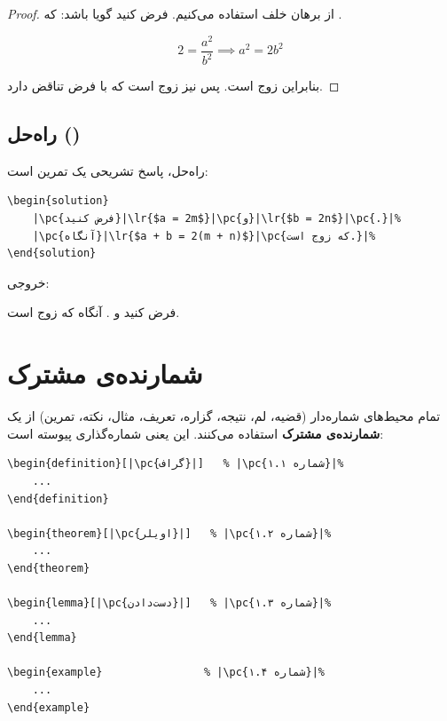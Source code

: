 \begin{proof}
    از برهان خلف استفاده می‌کنیم. فرض کنید 
    گویا باشد:  که
    .

    \[
    2 = \frac{a^{2}}{b^{2}} \implies a^{2} = 2b^{2}
    \]

    بنابراین  زوج است. پس  نیز
    زوج است که با فرض 
    تناقض دارد.
\end{proof}


\subsection{راه‌حل ()}
\label{sec:environments-solution}

راه‌حل، پاسخ تشریحی یک تمرین است:

\begin{latin}
\begin{verbatim}
\begin{solution}
    |\pc{فرض کنید}|\lr{$a = 2m$}|\pc{و}|\lr{$b = 2n$}|\pc{.}|%
    |\pc{آنگاه}|\lr{$a + b = 2(m + n)$}|\pc{که زوج است.}|%
\end{solution}
\end{verbatim}
\end{latin}

خروجی:

\begin{solution}
    فرض کنید  و .
    آنگاه  که زوج است.
\end{solution}


\section{شمارنده‌ی مشترک}
\label{sec:environments-counter}

تمام محیط‌های شماره‌دار (قضیه، لم، نتیجه، گزاره،
تعریف، مثال، نکته، تمرین) از یک \textbf{شمارنده‌ی
مشترک} استفاده می‌کنند. این یعنی شماره‌گذاری
پیوسته است:

\begin{latin}
\begin{verbatim}
\begin{definition}[|\pc{گراف}|]   % |\pc{شماره ۱.۱}|%
    ...
\end{definition}

\begin{theorem}[|\pc{اویلر}|]   % |\pc{شماره ۱.۲}|%
    ...
\end{theorem}

\begin{lemma}[|\pc{دست‌دادن}|]   % |\pc{شماره ۱.۳}|%
    ...
\end{lemma}

\begin{example}                % |\pc{شماره ۱.۴}|%
    ...
\end{example}
\end{verbatim}
\end{latin}

